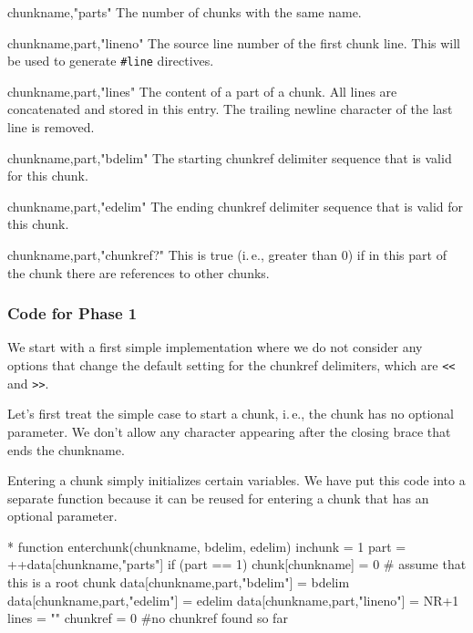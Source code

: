 \documentclass[a4paper]{article} %
\newcommand{\ie}{i.\,e.}
\newenvironment{ttdescription}
  {\list{}{\labelwidth0pt \itemindent-\leftmargin
      \def\makelabel##1{\hspace\labelsep
        \normalfont\ttfamily ##1:}}}
  {\endlist}
\begin{document}
\begin{ttdescription}
\item[chunkname,"parts"] The number of chunks with the same name.

\item[chunkname,part,"lineno"] The source line number of the first
  chunk line. This will be used to generate \texttt{\#line}
  directives.

\item[chunkname,part,"lines"] The content of a part of a chunk. All
  lines are concatenated and stored in this entry. The trailing
  newline character of the last line is removed.

\item[chunkname,part,"bdelim"] The starting chunkref delimiter
  sequence that is valid for this chunk.

\item[chunkname,part,"edelim"] The ending chunkref delimiter sequence
  that is valid for this chunk.

\item[chunkname,part,"chunkref?"] This is true (\ie, greater than 0)
  if in this part of the chunk there are references to other chunks.
\end{ttdescription}

\subsubsection{Code for Phase 1}

We start with a first simple implementation where we do not consider
any options that change the default setting for the chunkref
delimiters, which are \texttt{<<} and \texttt{>>}.

Let's first treat the simple case to start a chunk, \ie, the chunk has
no optional parameter. We don't allow any character appearing after
the closing brace that ends the chunkname.

Entering a chunk simply initializes certain variables. We have put
this code into a separate function because it can be reused for
entering a chunk that has an optional parameter.
\begin{chunk}{*}
function enterchunk(chunkname, bdelim, edelim) {
  inchunk = 1
  part = ++data[chunkname,"parts"]
  if (part == 1) {chunk[chunkname] = 0} # assume that this is a root chunk
  data[chunkname,part,"bdelim"] = bdelim
  data[chunkname,part,"edelim"] = edelim
  data[chunkname,part,"lineno"] = NR+1
  lines = ""
  chunkref = 0 #no chunkref found so far
}
\end{chunk}
\end{document}
